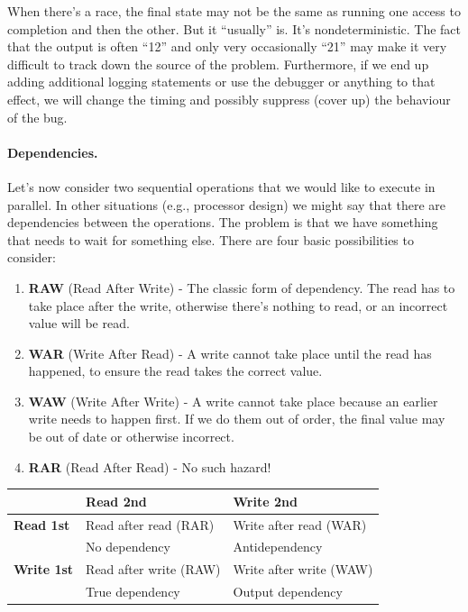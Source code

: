 \documentclass[a4paper]{report}
\begin{document}
When there's a race, the final state may not be the same as running
one access to completion and then the other. But it ``usually'' is. It's nondeterministic. The fact that the output is often ``12'' and only very occasionally ``21'' may make it very difficult to track down the source of the problem. Furthermore, if we end up adding additional logging statements or use the debugger or anything to that effect, we will change the timing and possibly suppress (cover up) the behaviour of the bug.

\paragraph{Dependencies.}
Let's now consider two sequential operations that we would like to execute in parallel.
In other situations (e.g., processor design) we might say that there are dependencies between the operations. The problem is that we have something that needs to wait for something else. There are four basic possibilities to consider:

\begin{enumerate}
	\item \textbf{RAW} (Read After Write) - The classic form of dependency. The read has to take place after the write, otherwise there's nothing to read, or an incorrect value will be read.
	\item \textbf{WAR} (Write After Read) - A write cannot take place until the read has happened, to ensure the read takes the correct value.
	\item \textbf{WAW} (Write After Write) - A write cannot take place because an earlier write needs to happen first. If we do them out of order, the final value may be out of date or otherwise incorrect.
	\item \textbf{RAR} (Read After Read) - No such hazard! 
\end{enumerate}

\begin{center}
\begin{tabular}{l|ll}
& {\bf Read 2nd} & {\bf Write 2nd} \\ \hline
{\bf Read 1st} & Read after read (RAR) & Write after read (WAR) \\
& No dependency & Antidependency \\
{\bf Write 1st} & Read after write (RAW) & Write after write (WAW) \\
& True dependency & Output dependency
\end{tabular}
\end{center}
\end{document}
